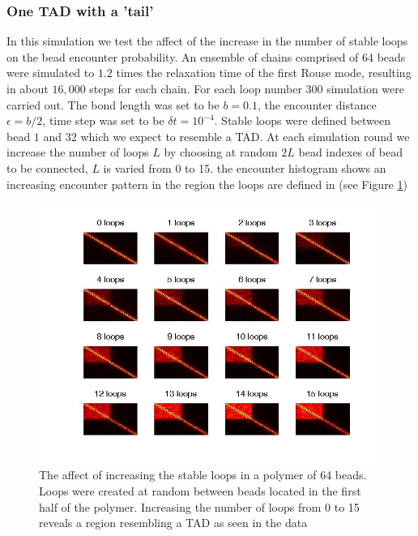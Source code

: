 \documentclass[12pt]{book}
\begin{document}
\subsubsection{One TAD with  a 'tail'}
In this simulation we test the affect of the increase in the number of stable loops on the bead encounter probability. An ensemble of chains comprised of 64 beads were simulated to $1.2$ times the relaxation time of the first Rouse mode, resulting in about $16,000$ steps for each chain. For each loop number 300 simulation were carried out. The bond length was set to be $b=0.1$, the encounter distance $\epsilon=b/2$, time step was set to be $\delta t=10^{-4}$. Stable loops were defined between bead $1$ and $32$ which we expect to resemble a TAD. At each simulation round we increase the number of loops $L$ by choosing at random $2L$ bead indexes of bead to be connected, $L$ is varied from 0 to 15. the encounter histogram shows an increasing encounter pattern in the region the loops are defined in (see Figure \ref{figure_stableLoopModelVariableLoopNumber64Beads})
 
\begin{figure}[H]
\includegraphics[scale=0.3]{stableLoopModelVariableLoopNumber64Beads}
\caption{\scriptsize{The affect of increasing the stable loops in a polymer of 64 beads. Loops were created at random between beads located in the first half of the polymer. Increasing the number of loops from 0 to 15 reveals a region resembling a TAD as seen in the data}}
\label{figure_stableLoopModelVariableLoopNumber64Beads}
\end{figure} 
 
\end{document}
